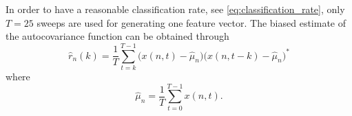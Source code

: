 





In order to have a reasonable classification rate, see \eqref{eq:classification_rate}, only $T=25$ sweeps are used for generating one feature vector. The biased estimate of the autocovariance function can be obtained through \citep{jakobsson_2015}
\begin{equation}
\label{eq:ac}
	\hat{r}_n(k) = \frac{1}{T}\sum_{t=k}^{T-1}\big(x(n,t) - \hat{\mu}_n\big)\big(x(n,t-k) - \hat{\mu}_n\big)^*
\end{equation}
where 
\begin{equation}
	\hat{\mu}_n = \frac1T \sum_{t=0}^{T-1}x(n,t).
\end{equation}

